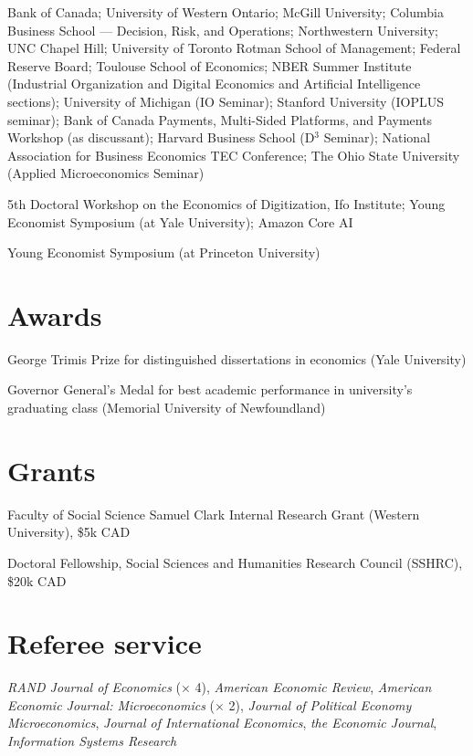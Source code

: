 \documentclass[11pt]{article} %
\begin{document}
 Bank of Canada; University of Western Ontario;
	McGill University; Columbia Business School --- Decision, Risk, and Operations;
	Northwestern University; UNC Chapel Hill; University of Toronto Rotman School
	of Management; Federal Reserve Board; Toulouse School of Economics;
	NBER Summer Institute (Industrial Organization and Digital Economics and Artificial
	Intelligence sections); University of Michigan (IO Seminar);
	Stanford University (IOPLUS seminar); Bank of Canada Payments, Multi-Sided Platforms, and Payments
	Workshop (as discussant); 
	Harvard Business School (D${}^3$ Seminar); 
	National Association for Business Economics TEC Conference;
	The Ohio State University (Applied Microeconomics Seminar)


 5th Doctoral Workshop on the Economics of Digitization, Ifo Institute; 
	Young Economist Symposium (at Yale University); Amazon Core AI


 Young Economist Symposium (at Princeton University)

\section*{Awards}

 George Trimis Prize for distinguished dissertations in economics (Yale University)

 Governor General's Medal for best academic performance in university's graduating class
	(Memorial University of Newfoundland)

\section*{Grants}

 Faculty of Social Science Samuel Clark Internal Research Grant (Western University), \$5k CAD

  Doctoral Fellowship, Social Sciences and Humanities Research Council (SSHRC), \$20k CAD


\section*{Referee service}

\textit{RAND Journal of Economics} ($\times$ 4), \textit{American Economic Review},
\textit{American Economic Journal: Microeconomics} ($\times$ 2),
 \textit{Journal of Political Economy Microeconomics},
\textit{Journal of International Economics}, \textit{the Economic Journal},
\textit{Information Systems Research}
\end{document}
